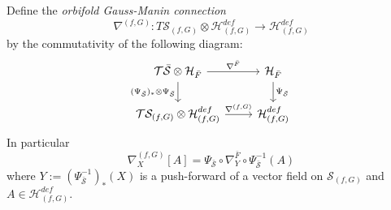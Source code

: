 \documentclass[reqno,12pt]{amsart}
\numberwithin{equation}{section}
\theoremstyle{plain}
\newtheorem{proposition}[theorem]{Proposition}
\theoremstyle{definition}
\newcommand\DistTo{\xrightarrow{
   \,\smash{\raisebox{-0.65ex}{\ensuremath{\scriptstyle\sim}}}\,}}
\newcommand{\CC}{{\mathbb{C}}}
\newcommand{\Jac}{\mathrm{Jac}}
\def\H{{\mathcal H}}
\def\O{{\mathcal O}}
\def\T{{\mathcal T}}
\numberwithin{equation}{section}
\begin{document}

Define the \emph{orbifold Gauss-Manin connection}
\[
    \nabla^{(f,G)}: T\mathcal{S}_{(f,G)} \otimes \H^{def}_{(f,G)} \to \H^{def}_{(f,G)}
\]
by the commutativity of the following diagram:
\[ \begin{tikzcd}
\T \bar{\mathcal{S}} \otimes \H_{\bar F} \arrow{r}{\nabla^{\bar F}} \arrow[swap]{d}{(\Psi_{\bar{\mathcal{S}}})_* \otimes \Psi_{\bar{\mathcal{S}}}} & \H_{\bar F} \arrow{d}{\Psi_{\bar{\mathcal{S}}}} \\%
\T \mathcal{S}_{(f,G)} \otimes \H^{def}_{(f,G)}  \arrow{r}{\nabla^{(f,G)}}& \H^{def}_{(f,G)}
\end{tikzcd}
\]
In particular
\[
\nabla^{(f,G)}_{X}[A] = \Psi_{\bar{\mathcal{S}}} \circ \nabla^{\bar F}_{Y} \circ  \Psi^{-1}_{\bar{\mathcal{S}}}(A)
\]
where $Y := (\Psi_{\bar{\mathcal{S}}}^{-1})_*(X)$ is a push-forward of a  vector field on $\mathcal{S}_{(f,G)}$ and $A \in \H_{(f,G)}^{def}$.

\end{document}
